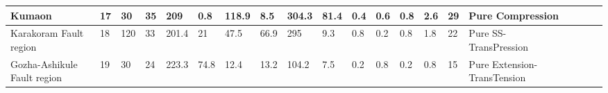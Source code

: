 \begin{flushleft}
\begin{table}[ht]
{\begin{tabular}{p{2cm}lllp{0.5cm}lllllllllllllp{1.2cm}p{2.5cm}}
Kumaon & 17 & 30 & 35 & 209 & 0.8 & 118.9 & 8.5 & 304.3 & 81.4 & 0.4 & 0.6 & 0.8 & 2.6 & 29 & Pure Compression \\ \hline
Karakoram   Fault region & 18 & 120 & 33 & 201.4 & 21 & 47.5 & 66.9 & 295 & 9.3 & 0.8 & 0.2 & 0.8 & 1.8 & 22 & Pure SS-TransPression \\ \hline
Gozha-Ashikule   Fault region & 19 & 30 & 24 & 223.3 & 74.8 & 12.4 & 13.2 & 104.2 & 7.5 & 0.2 & 0.8 & 0.2 & 0.8 & 15 & Pure Extension-TransTension \\ \hline
\end{tabular}
}
\end{table}
\end{flushleft}